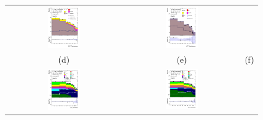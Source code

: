 \documentclass[PAPER, coverpage, atlasdraft=true, texlive=2016, UKenglish]{\ATLASLATEXPATH atlasdoc}
\begin{document}
\begin{figure}[H]
\begin{tabular}{@{}ccc@{}}
\includegraphics[width=0.29\textwidth]{figures/tcH_reg1l1tau1b3j_os.pdf}&
\includegraphics[width=0.29\textwidth]{figures/tcH_reg1l2tau1bnj_ss.pdf}\\
(d) & (e)  & (f) \\
\includegraphics[width=0.29\textwidth]{figures/tcH_reg2mtau1b2jos.pdf}&
\includegraphics[width=0.29\textwidth]{figures/tcH_reg2mtau1b3jos.pdf}&

\end{tabular}
\end{figure}
\end{document}
